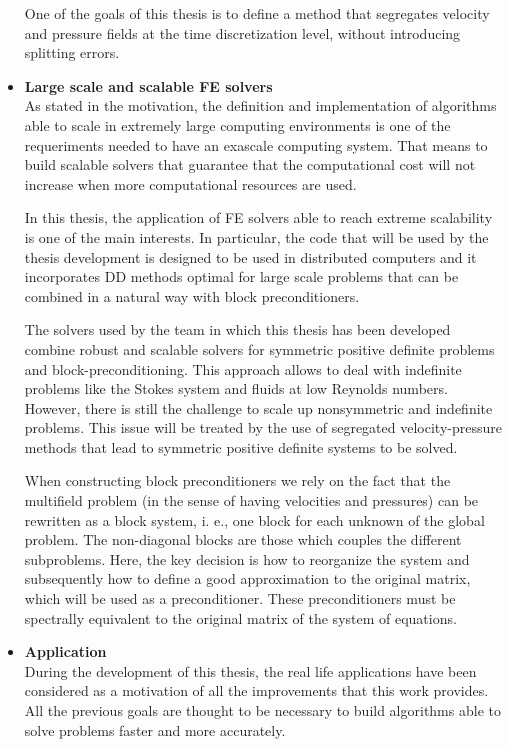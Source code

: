 \begin{itemize}
One of the goals of this thesis is to define a method that segregates velocity and pressure fields at the time discretization level, without introducing splitting errors.

\item {\bf Large scale and scalable FE solvers}\\
As stated in the motivation, the definition and implementation of algorithms able to scale in extremely large computing environments is one of the requeriments needed to have an exascale computing system. That means to build scalable solvers that guarantee that the computational cost will not increase when more computational resources are used.

In this thesis, the application of FE solvers able to reach extreme scalability is one of the main interests. In particular, the code that will be used by the thesis development is designed to be used in distributed computers and it incorporates DD methods optimal for large scale problems that can be combined in a natural way with block preconditioners.

The solvers used by the team in which this thesis has been developed combine robust and scalable solvers for symmetric positive definite problems and block-preconditioning. This approach allows to deal with indefinite problems like the Stokes system and fluids at low Reynolds numbers. However, there is still the challenge to scale up nonsymmetric and indefinite problems. This issue will be treated by the use of segregated velocity-pressure methods that lead to symmetric positive definite systems to be solved.

When constructing block preconditioners we rely on the fact that the multifield problem (in the sense of having velocities and pressures) can be rewritten as a block system, i. e., one block for each unknown of the global problem. The non-diagonal blocks are those which couples the different subproblems. Here, the key decision is how to reorganize the system and subsequently how to define a good approximation to the original matrix, which will be used as a preconditioner. These preconditioners must be spectrally equivalent to the original matrix of the system of equations.

\item {\bf Application}\\
During the development of this thesis, the real life applications have been considered as a motivation of all the improvements that this work provides. All the previous goals are thought to be necessary to build algorithms able to solve problems faster and more accurately.


\end{itemize}
